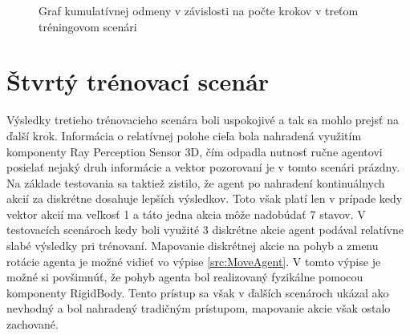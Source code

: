 \documentclass[slovak, master]{diploma}
\begin{document}
\begin{figure}[!htbp]
    \centering
    \caption{Graf kumulatívnej odmeny v závislosti na počte krokov v treťom tréningovom scenári}
    \label{plt:thirdcenario}
\end{figure}

\section{Štvrtý trénovací scenár}
\label{sec:FourthScenario}
Výsledky tretieho trénovacieho scenára boli uspokojivé a tak sa mohlo prejsť na ďalší krok. Informácia o relatívnej polohe cieľa bola nahradená využitím komponenty Ray Perception Sensor 3D, čím odpadla nutnosť ručne agentovi posielať nejaký druh informácie a vektor pozorovaní je v tomto scenári prázdny. Na základe testovania sa taktiež zistilo, že agent po nahradení kontinuálnych akcií za diskrétne dosahuje lepších výsledkov. Toto však platí len v prípade kedy vektor akcií ma veľkosť 1 a táto jedna akcia môže nadobúdať 7 stavov. V testovacích scenároch kedy boli využité 3 diskrétne akcie agent podával relatívne slabé výsledky pri trénovaní. Mapovanie diskrétnej akcie na pohyb a zmenu rotácie agenta je možné vidieť vo výpise \ref{src:MoveAgent}. V tomto výpise je možné si povšimnúť, že pohyb agenta bol realizovaný fyzikálne pomocou komponenty RigidBody. Tento prístup sa však v ďalších scenároch ukázal ako nevhodný a bol nahradený tradičným prístupom, mapovanie akcie však ostalo zachované.
\end{document}
